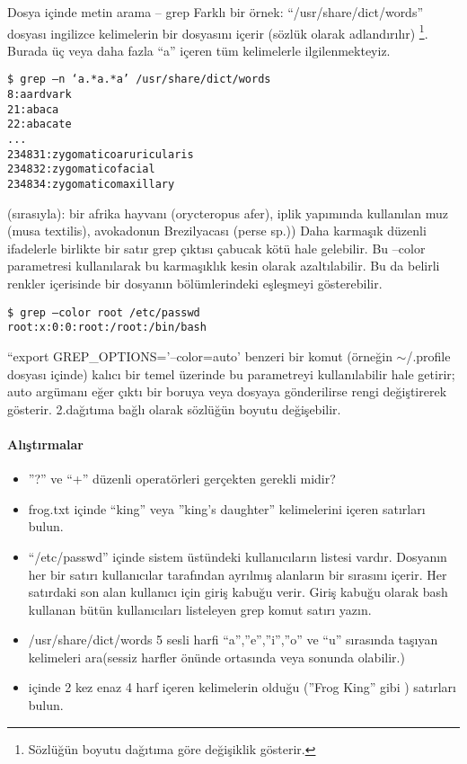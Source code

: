 \begin{section}{Dosya içinde metin arama – grep}
Farklı bir örnek: “/usr/share/dict/words” dosyası ingilizce kelimelerin bir dosyasını içerir (sözlük olarak adlandırılır)
\footnote{Sözlüğün boyutu dağıtıma göre değişiklik gösterir.}. Burada üç veya daha fazla “a”  içeren tüm kelimelerle ilgilenmekteyiz.

\begin{verbatim}
$ grep –n ‘a.*a.*a’ /usr/share/dict/words
8:aardvark
21:abaca
22:abacate
...
234831:zygomaticoaruricularis
234832:zygomaticofacial
234834:zygomaticomaxillary
\end{verbatim}

(sırasıyla): bir afrika hayvanı (orycteropus afer), iplik yapımında kullanılan muz (musa textilis), avokadonun Brezilyacası (perse sp.)) Daha karmaşık düzenli ifadelerle birlikte bir satır grep çıktısı çabucak kötü hale gelebilir. Bu –color parametresi kullanılarak bu karmaşıklık kesin olarak azaltılabilir. Bu da belirli renkler içerisinde bir dosyanın bölümlerindeki eşleşmeyi gösterebilir.
\begin{verbatim}
$ grep –color root /etc/passwd
root:x:0:0:root:/root:/bin/bash
\end{verbatim}

“export GREP\_OPTIONS='--color=auto' benzeri bir komut (örneğin $\sim$/.profile dosyası içinde) kalıcı bir temel üzerinde bu parametreyi kullanılabilir hale getirir; auto argümanı eğer çıktı bir boruya veya dosyaya gönderilirse rengi değiştirerek gösterir. 2.dağıtıma bağlı olarak sözlüğün boyutu değişebilir.

\paragraph{Alıştırmalar}{
\begin{itemize}
 \item ”?” ve “+”  düzenli operatörleri gerçekten gerekli midir?
\item frog.txt içinde “king” veya ”king’s daughter” kelimelerini içeren satırları bulun.
\item “/etc/passwd” içinde sistem üstündeki kullanıcıların listesi vardır. Dosyanın her bir satırı kullanıcılar tarafından ayrılmış alanların bir sırasını içerir. Her satırdaki son alan kullanıcı için giriş kabuğu verir. Giriş kabuğu olarak bash kullanan bütün kullanıcıları listeleyen grep komut satırı yazın.
\item /usr/share/dict/words  5 sesli harfi “a”,”e”,”i”,”o” ve “u” sırasında taşıyan kelimeleri ara(sessiz harfler önünde ortasında veya sonunda olabilir.)
\item içinde 2 kez  enaz 4 harf içeren kelimelerin olduğu (”Frog King” gibi ) satırları bulun.
\end{itemize}}


\end{section}
